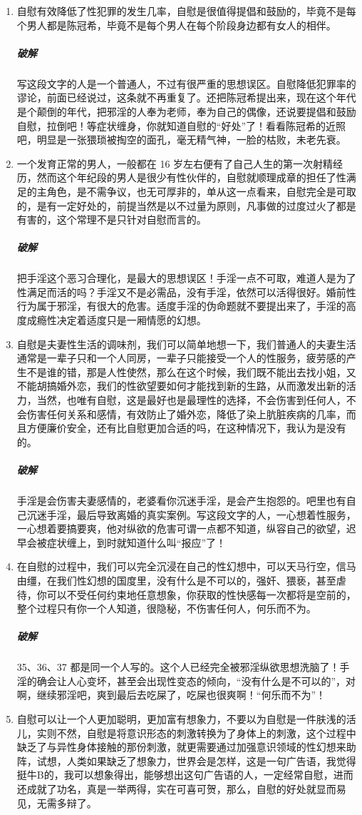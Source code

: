 \begin{enumerate}
    \item 自慰有效降低了性犯罪的发生几率，自慰是很值得提倡和鼓励的，毕竟不是每个男人都是陈冠希，毕竟不是每个男人在每个阶段身边都有女人的相伴。
    \subparagraph{破解} 写这段文字的人是一个普通人，不过有很严重的思想误区。自慰降低犯罪率的谬论，前面已经说过，这条就不再重复了。还把陈冠希提出来，现在这个年代是个颠倒的年代，把邪淫的人奉为老师，奉为自己的偶像，还说要提倡和鼓励自慰，拉倒吧！等症状缠身，你就知道自慰的“好处”了！看看陈冠希的近照吧，明显是一张猥琐被掏空的面孔，毫无精气神，一脸的枯败，未老先衰。
    \item 一个发育正常的男人，一般都在 16 岁左右便有了自己人生的第一次射精经历，然而这个年纪段的男人是很少有性伙伴的，自慰就顺理成章的担任了性满足的主角色，是不需争议，也无可厚非的，单从这一点看来，自慰完全是可取的，是有一定好处的，前提当然是以不过量为原则，凡事做的过度过火了都是有害的，这个常理不是只针对自慰而言的。
    \subparagraph{破解} 把手淫这个恶习合理化，是最大的思想误区！手淫一点不可取，难道人是为了性满足而活的吗？手淫又不是必需品，没有手淫，依然可以活得很好。婚前性行为属于邪淫，有很大的危害。适度手淫的伪命题就不要提出来了，手淫的高度成瘾性决定着适度只是一厢情愿的幻想。
    \item 自慰是夫妻性生活的调味剂，我们可以简单地想一下，我们普通人的夫妻生活通常是一辈子只和一个人同房，一辈子只能接受一个人的性服务，疲劳感的产生不是谁的错，那是人性使然，那么在这个时候，我们既不能出去找小姐，又不能胡搞婚外恋，我们的性欲望要如何才能找到新的生路，从而激发出新的活力，当然，也唯有自慰，这是最好也是最理性的选择，不会伤害到任何人，不会伤害任何关系和感情，有效防止了婚外恋，降低了染上肮脏疾病的几率，而且方便廉价安全，还有比自慰更加合适的吗，在这种情况下，我认为是没有的。
    \subparagraph{破解} 手淫是会伤害夫妻感情的，老婆看你沉迷手淫，是会产生抱怨的。吧里也有自己沉迷手淫，最后导致离婚的真实案例。写这段文字的人，一心想着性服务，一心想着要搞要爽，他对纵欲的危害可谓一点都不知道，纵容自己的欲望，迟早会被症状缠上，到时就知道什么叫“报应”了！
    \item 在自慰的过程中，我们可以完全沉浸在自己的性幻想中，可以天马行空，信马由缰，在我们性幻想的国度里，没有什么是不可以的，强奸、猥亵，甚至虐待，你可以不受任何约束地任意想象，你获取的性快感每一次都将是空前的，整个过程只有你一个人知道，很隐秘，不伤害任何人，何乐而不为。
    \subparagraph{破解} 35、36、37 都是同一个人写的。这个人已经完全被邪淫纵欲思想洗脑了！手淫的确会让人心变坏，甚至会出现性变态的倾向，“没有什么是不可以的”，对啊，继续邪淫吧，爽到最后去吃屎了，吃屎也很爽啊！“何乐而不为”！
    \item 自慰可以让一个人更加聪明，更加富有想象力，不要以为自慰是一件肤浅的活儿，实则不然，自慰是将意识形态的刺激转换为了身体上的刺激，这个过程中缺乏了与异性身体接触的那份刺激，就更需要通过加强意识领域的性幻想来助阵，试想，人类如果缺乏了想象力，世界会是怎样，这是一句广告语，我觉得挺牛B的，我可以想象得出，能够想出这句广告语的人，一定经常自慰，进而还成就了功名，真是一举两得，实在可喜可贺，那么，自慰的好处就显而易见，无需多辩了。

\end{enumerate}
